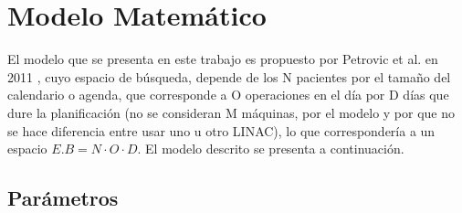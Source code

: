 \documentclass[letter, 10pt]{article}
\begin{document}
\section{Modelo Matemático}
El modelo que se presenta en este trabajo es propuesto por Petrovic et al. en 2011 \cite{ocho}, cuyo espacio de búsqueda, depende de los N pacientes por el tamaño del calendario o agenda, que corresponde a O operaciones en el día por D días que dure la planificación (no se consideran M máquinas, por el modelo y por que no se hace diferencia entre usar uno u otro LINAC), lo que correspondería a un espacio $E.B= N \cdot O \cdot D$. El modelo descrito se presenta a continuación.

\subsection{Parámetros}
\end{document}
